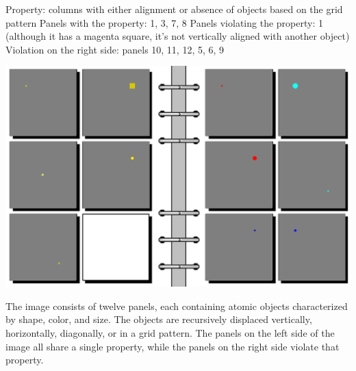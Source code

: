 \begin{tcolorbox}[breakable,enhanced jigsaw,opacityback=0,]
\begin{dialogue}
		Property: columns with either alignment or absence of objects based on the grid pattern
		Panels with the property: 1, 3, 7, 8
		Panels violating the property: 1 (although it has a magenta square, it's not vertically aligned with another object)
		Violation on the right side: panels 10, 11, 12, 5, 6, 9
		\\
	\end{dialogue}
	\label{fig:task7-bongard}
\end{tcolorbox}




\begin{tcolorbox}[breakable,enhanced jigsaw,opacityback=0,]
	\centering
	\includegraphics[width=.8\linewidth]{imgs/bongard/easy-8.png}\\
	\begin{dialogue}
		 The image consists of twelve panels, each containing atomic objects characterized by shape, color, and size. The objects are recursively displaced vertically, horizontally, diagonally, or in a grid pattern. The panels on the left side of the image all share a single property, while the panels on the right side violate that property.
		

\end{dialogue}
\end{tcolorbox}
